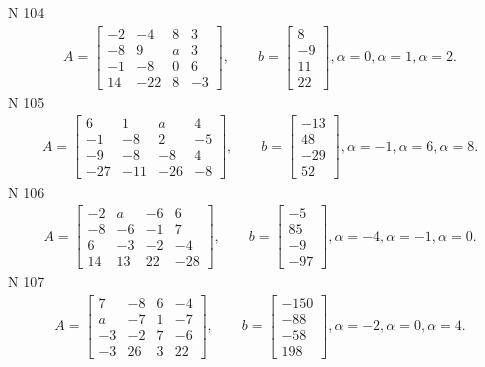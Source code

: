 \documentclass[11pt]{report}
\begin{document}
N 104
\begin{align*}
 A = \left[\begin{matrix}-2 & -4 & 8 & 3\\-8 & 9 & a & 3\\-1 & -8 & 0 & 6\\14 & -22 & 8 & -3\end{matrix}\right],
    \qquad b = \left[\begin{matrix}8\\-9\\11\\22\end{matrix}\right], \alpha = 0, \alpha = 1, \alpha = 2. 
 \end{align*}
N 105
\begin{align*}
 A = \left[\begin{matrix}6 & 1 & a & 4\\-1 & -8 & 2 & -5\\-9 & -8 & -8 & 4\\-27 & -11 & -26 & -8\end{matrix}\right],
    \qquad b = \left[\begin{matrix}-13\\48\\-29\\52\end{matrix}\right], \alpha = -1, \alpha = 6, \alpha = 8. 
 \end{align*}
N 106
\begin{align*}
 A = \left[\begin{matrix}-2 & a & -6 & 6\\-8 & -6 & -1 & 7\\6 & -3 & -2 & -4\\14 & 13 & 22 & -28\end{matrix}\right],
    \qquad b = \left[\begin{matrix}-5\\85\\-9\\-97\end{matrix}\right], \alpha = -4, \alpha = -1, \alpha = 0. 
 \end{align*}
N 107
\begin{align*}
 A = \left[\begin{matrix}7 & -8 & 6 & -4\\a & -7 & 1 & -7\\-3 & -2 & 7 & -6\\-3 & 26 & 3 & 22\end{matrix}\right],
    \qquad b = \left[\begin{matrix}-150\\-88\\-58\\198\end{matrix}\right], \alpha = -2, \alpha = 0, \alpha = 4. 
 \end{align*}
\end{document}
